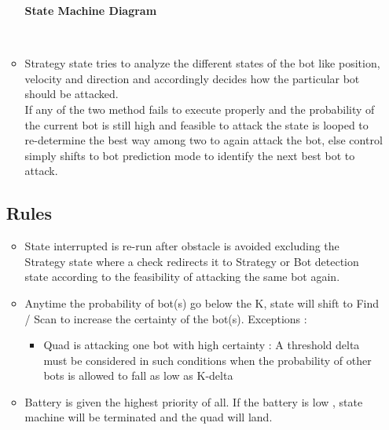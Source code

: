 \documentclass[12pt]{article}
\begin{document}
\begin{itemize}
\begin{itemize}
\begin{center}
\textbf{State Machine Diagram}\end{center}\\
\item{Strategy state tries to analyze the different states of the bot like position, velocity and direction and accordingly decides how the particular bot should be attacked.
}\\
If any of the two method fails to execute properly and the probability of the current bot is still high and feasible to attack the state is looped to re-determine the best way among two to again attack the bot, else control simply shifts to bot prediction mode to identify the next best bot to attack.
\end{itemize}
\subsection{Rules}
\begin{itemize}
\item{State interrupted is re-run after obstacle is avoided excluding the Strategy state where a check redirects it to Strategy or Bot detection state according to the feasibility of attacking the same bot again.
}
\item{Anytime the probability of bot(s) go below the K, state will shift to Find / Scan to increase the certainty of the bot(s). Exceptions :
}
\begin{itemize}
\item{Quad is attacking one bot with high certainty : A threshold delta must be considered in such conditions when the probability of other bots is allowed to fall as low as K-delta %
}
\end{itemize}
\item{Battery is given the highest priority of all. If the battery is low , state machine will be terminated and the quad will land.
}
\end{itemize}

\end{itemize}
\end{document}
